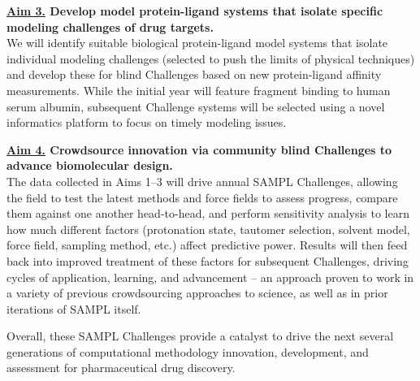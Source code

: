 \documentclass[11pt]{article}
\begin{document}
{\bf \underline{Aim 3.} Develop model protein-ligand systems that isolate specific modeling challenges of drug targets.}\\
We will identify suitable biological protein-ligand model systems that isolate individual modeling challenges (selected to push the limits of physical techniques) and develop these for blind Challenges based on new protein-ligand affinity measurements.
While the initial year will feature fragment binding to human serum albumin, subsequent Challenge systems will be selected using a novel informatics platform to focus on timely modeling issues.

{\bf \underline{Aim 4.} Crowdsource innovation via community blind Challenges to advance biomolecular design.} \\
The data collected in Aims 1--3 will drive annual SAMPL Challenges, allowing the field to test the latest methods and force fields to assess progress, compare them against one another head-to-head, and perform sensitivity analysis to learn how much different factors (protonation state, tautomer selection, solvent model, force field, sampling method, etc.) affect predictive power. 
Results will then feed back into improved treatment of these factors for subsequent Challenges, driving cycles of application, learning, and advancement -- an approach proven to work in a variety of previous crowdsourcing approaches to science, as well as in prior iterations of SAMPL itself.

Overall, these SAMPL Challenges provide a catalyst to drive the next several generations of computational methodology innovation, development, and assessment for pharmaceutical drug discovery. 


\end{document}
